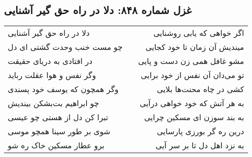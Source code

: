 \begin{center}
\section*{غزل شماره ۸۴۸: دلا در راه حق گیر آشنایی}
\label{sec:848}
\begin{longtable}{l p{0.5cm} r}
دلا در راه حق گیر آشنایی
&&
اگر خواهی که یابی روشنایی
\\
چو مست خنب وحدت گشتی ای دل
&&
میندیش آن زمان تا خود کجایی
\\
در افتادی به دریای حقیقت
&&
مشو غافل همی زن دست و پایی
\\
وگر نفس و هوا عقلت رباید
&&
تو می‌دان آن نفس از خود برایی
\\
وگر همچون که یوسف خود پسندی
&&
کشی در چاه محنت‌ها بلایی
\\
چو ابراهیم بت‌بشکن بیندیش
&&
به هر آتش که خود خواهی درآیی
\\
تبرا کن دل از هستی چو عیسی
&&
به بند سوزن ای مسکین چرایی
\\
شوی بر طور سینا همچو موسی
&&
درین ره گر بورزی پارسایی
\\
برو عطار مسکین خاک ره شو
&&
به نزد اهل دل تا بر سر آیی
\\
\end{longtable}
\end{center}
